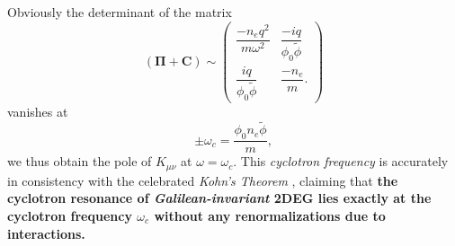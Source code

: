 \documentclass[bachelor,english,numbers]{ustcthesis}
\begin{document}
		Obviously the determinant of the matrix
		\begin{equation*}
			(\bm{\Pi}+\bm{C})\sim\left(
			\begin{array}{cc}
				\dfrac{-n_eq^2}{m\omega^2} & \dfrac{-iq}{\phi_0\widetilde{\phi}}\\
				\dfrac{iq}{\phi_0 \widetilde{\phi} } & \dfrac{-n_e}{m}.
			\end{array}\right)
		\end{equation*}
		vanishes at
		\begin{equation}
			\pm\omega_c=\dfrac{\phi_0 n_e \widetilde{\phi} }{m},
		\end{equation}
		we thus obtain the pole of $K_{\mu\nu}$ at $\omega=\omega_c$. This \emph{cyclotron frequency} is accurately in consistency with the celebrated \emph{Kohn's Theorem} \cite{kohn1961cyclotron}, claiming that \cite{Fradkin2013Field} {\bf the cyclotron resonance of \emph{Galilean-invariant} 2DEG lies exactly at the cyclotron frequency $\omega_c$ without any renormalizations due to interactions.}


\end{document}
